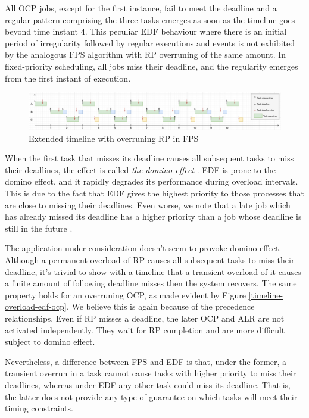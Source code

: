 \documentclass{article}
\begin{document}
All OCP jobs, except for the first instance, fail to meet the deadline and a regular pattern comprising the three tasks emerges as soon as the timeline goes beyond time instant 4. This peculiar EDF behaviour where there is an initial period of irregularity followed by regular executions and events is not exhibited by the analogous FPS algorithm with RP overruning of the same amount. In fixed-priority scheduling, all jobs miss their deadline, and the regularity emerges from the first instant of execution.

\begin{figure}[!htbp]
\centering
\includegraphics[width=6.5in]{images/timeline-overload-fps-extended}
\caption{Extended timeline with overruning RP in FPS}
\label{timeline-overload-fps-extended}
\end{figure}

When the first task that misses its deadline causes all subsequent tasks to miss their deadlines, the effect is called \textit{the domino effect} \cite{value-deadline}. EDF is prone to the domino effect, and it rapidly degrades its performance during overload intervals. This is due to the fact that EDF gives the highest priority to those processes that are close to missing their deadlines. Even worse, we note that a late job which has already missed its deadline has a higher priority than a job whose deadline is still in the future \cite{fps-vs-edf}.

The application under consideration doesn't seem to provoke domino effect. Although a permanent overload of RP causes all subsequent tasks to miss their deadline, it's trivial to show with a timeline that a transient overload of it causes a finite amount of following deadline misses then the system recovers. The same property holds for an overruning OCP, as made evident by Figure \ref{timeline-overload-edf-ocp}. We believe this is again because of the precedence relationships. Even if RP misses a deadline, the later OCP and ALR are not activated independently. They wait for RP completion and are more difficult subject to domino effect.

Nevertheless, a difference between FPS and EDF is that, under the former, a transient overrun in a task cannot cause tasks with higher priority to miss their deadlines, whereas under EDF any other task could miss its deadline. That is, the latter does not provide any type of guarantee on which tasks will meet their timing constraints.
\end{document}
